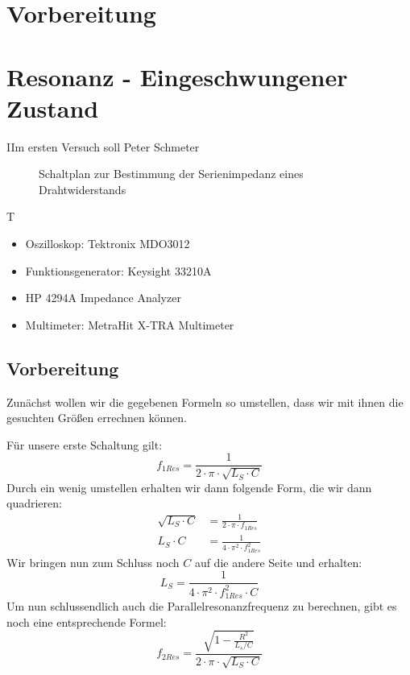 \documentclass{article}
\begin{document}
\newpage
\thispagestyle{empty}

\tableofcontents


\newpage


\section{Vorbereitung}

\section{Resonanz - Eingeschwungener Zustand}
\begin{task}
  IIm ersten Versuch soll Peter Schmeter
\end{task}
\begin{figure}[h]
  \begin{center}

    \caption{Schaltplan zur Bestimmung der Serienimpedanz eines Drahtwiderstands}
  \end{center}
\end{figure}
\begin{devlist}
  T
  \begin{itemize}
    \item Oszilloskop: Tektronix MDO3012
    \item Funktionsgenerator: Keysight 33210A
    \item HP 4294A Impedance Analyzer
    \item Multimeter: MetraHit X-TRA Multimeter
  \end{itemize}
\end{devlist}
\subsection{Vorbereitung}
\begin{figure}

\end{figure}
Zunächst wollen wir die gegebenen Formeln so umstellen, dass wir mit ihnen die gesuchten Größen errechnen können.

Für unsere erste Schaltung gilt:
\begin{equation}
  f_{1Res} = \frac{1}{2\cdot \pi \cdot \sqrt{L_S \cdot C}}
\end{equation}
Durch ein wenig umstellen erhalten wir dann folgende Form, die wir dann quadrieren:
\begin{align*}
  \sqrt{L_S\cdot C} & = \frac{1}{2\cdot\pi \cdot f_{1Res}}    \\
  L_S \cdot C       & = \frac{1}{4\cdot\pi^2\cdot f_{1Res}^2}
\end{align*}
Wir bringen nun zum Schluss noch $C$ auf die andere Seite und erhalten:
\begin{equation}\label{eq:LS}
  L_S = \frac{1}{4\cdot\pi^2\cdot f_{1Res}^2\cdot C}
\end{equation}
Um nun schlussendlich auch die Parallelresonanzfrequenz zu berechnen, gibt es noch eine entsprechende Formel:
\begin{equation}\label{eq:f2}
  f_{2Res} = \frac{\sqrt{1-\frac{R^2}{L_s/C}}}{2\cdot\pi\cdot\sqrt{L_S\cdot C}}
\end{equation}
\end{document}

